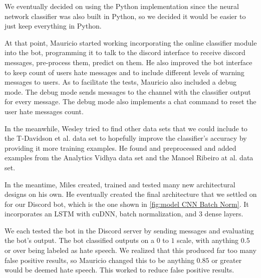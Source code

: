 \documentclass[conference]{sig-alternate-05-2015}
\begin{document}
We eventually decided on using the Python implementation since the neural network classifier was also built in Python, so we decided it would be easier to just keep everything in Python.

At that point, Mauricio started working incorporating the online classifier module into the bot, programming it to talk to the discord interface to receive discord messages, pre-process them, predict on them. He also improved the bot interface to keep count of users hate messages and to include different levels of warning messages to users. As to facilitate the tests, Mauricio also included a debug mode. The debug mode sends messages to the channel with the classifier output for every message. The debug mode also implements a chat command to reset the user hate messages count.

In the meanwhile, Wesley tried to find other data sets that we could include to the T-Davidson et al. data set to hopefully improve the classifier's accuracy by providing it more training examples. He found and preprocessed and added examples from the Analytics Vidhya data set and the Manoel Ribeiro at al. data set.

In the meantime, Miles created, trained and tested many new architectural designs on his own. He eventually created the final architecture that we settled on for our Discord bot, which is the one shown in \ref{fig:model CNN Batch Norm}. It incorporates an LSTM with cuDNN, batch normalization, and 3 dense layers.

We each tested the bot in the Discord server by sending messages and evaluating the bot's output. The bot classified outputs on a $0$ to $1$ scale, with anything $0.5$ or over being labeled as hate speech. We realized that this produced far too many false positive results, so Mauricio changed this to be anything $0.85$ or greater would be deemed hate speech. This worked to reduce false positive results.




\end{document}
